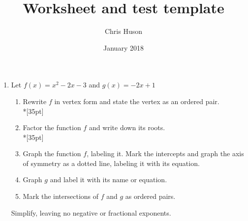 \documentclass[12pt, oneside]{article}
\title{Worksheet and test template}
\author{Chris Huson}
\date{January 2018}
\begin{document}
\begin{enumerate}

\item Let $f(x) = x^2-2x-3$ and $g(x)=-2x+1$
\begin{enumerate}
    \item Rewrite $f$ in vertex form and state the vertex as an ordered pair.\\*[35pt]
    \item Factor the function $f$ and write down its roots.\\*[35pt]
    \item Graph the function $f$, labeling it. Mark the intercepts and graph the axis of symmetry as a dotted line, labeling it with its equation.
    \item Graph $g$ and label it with its name or equation.
    \item Mark the intersections of $f$ and $g$ as ordered pairs. 

\end{enumerate}


\begin{figure}[!htbp]
\begin{center}
\end{center}
\end{figure}

\newpage



Simplify, leaving no negative or fractional exponents.




\end{enumerate}
\end{document}
